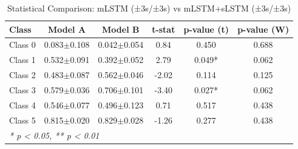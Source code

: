 \begin{table}[htbp]
\centering
\caption{Statistical Comparison: mLSTM (±3s/±3s) vs mLSTM+sLSTM (±3s/±3s)}
\label{tab:comparison_class_mlstm_±3s_±3s_vs_mlstmslstm_±3s_±3s}
\begin{tabular}{lccccc}
\toprule
\textbf{Class} & \textbf{Model A} & \textbf{Model B} & \textbf{t-stat} & \textbf{p-value (t)} & \textbf{p-value (W)} \\
\midrule
Class 0 & 0.083$\pm$0.108 & 0.042$\pm$0.054 & 0.84 & 0.450 & 0.688 \\
Class 1 & 0.532$\pm$0.091 & 0.392$\pm$0.052 & 2.79 & 0.049* & 0.062 \\
Class 2 & 0.483$\pm$0.087 & 0.562$\pm$0.046 & -2.02 & 0.114 & 0.125 \\
Class 3 & 0.579$\pm$0.036 & 0.706$\pm$0.101 & -3.40 & 0.027* & 0.062 \\
Class 4 & 0.546$\pm$0.077 & 0.496$\pm$0.123 & 0.71 & 0.517 & 0.438 \\
Class 5 & 0.815$\pm$0.020 & 0.829$\pm$0.028 & -1.26 & 0.277 & 0.438 \\
\bottomrule
\multicolumn{6}{l}{\textit{* p < 0.05, ** p < 0.01}} \\
\end{tabular}
\end{table}